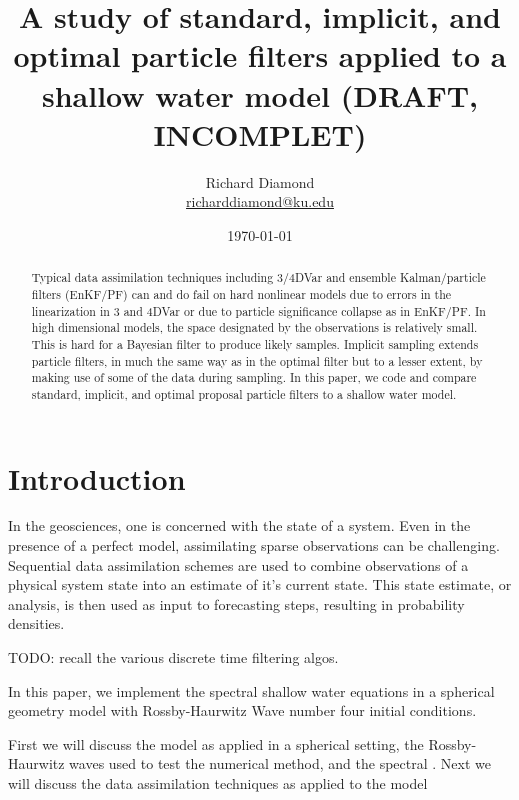 \documentclass[a4paper, 12pt, notitlepage]{report}
\title{A study of standard, implicit, and optimal particle filters
    applied to a shallow water model (DRAFT, INCOMPLET)}
\author{Richard Diamond \\ \href{mailto:richarddiamond@ku.edu}{richarddiamond@ku.edu}}
\date{\today}
\begin{document}
  \maketitle
  \thispagestyle{empty}

  \begin{abstract}
  Typical data assimilation techniques including 3/4DVar and ensemble
  Kalman/particle filters (EnKF/PF) can and do fail on hard nonlinear models due
  to errors in the linearization in 3 and 4DVar or due to particle significance
  collapse as in EnKF/PF. In high dimensional models, the space designated by
  the observations is relatively small. This is hard for a Bayesian filter to
  produce likely samples. Implicit sampling extends particle filters, in much
  the same way as in the optimal filter but to a lesser extent, by making use of
  some of the data during sampling. In this paper, we code and compare standard,
  implicit, and optimal proposal particle filters to a shallow water model.
  \end{abstract}

  \section{Introduction}
  In the geosciences, one is concerned with the state of a system. Even in the
  presence of a perfect model, assimilating sparse observations can be
  challenging. Sequential data assimilation schemes are used to combine
  observations of a physical system state into an estimate of it's current
  state. This state estimate, or analysis, is then used as input to forecasting
  steps, resulting in probability densities.

  \par
  TODO: recall the various discrete time filtering algos.

  \par
  In this paper, we implement the spectral shallow water equations in a spherical
  geometry model with Rossby-Haurwitz Wave number four initial conditions.
  \par
  First we will discuss the model as applied in a spherical setting, the
  Rossby-Haurwitz waves used to test the numerical method, and the spectral . Next we will discuss
  the data assimilation techniques as applied to the model
\end{document}
